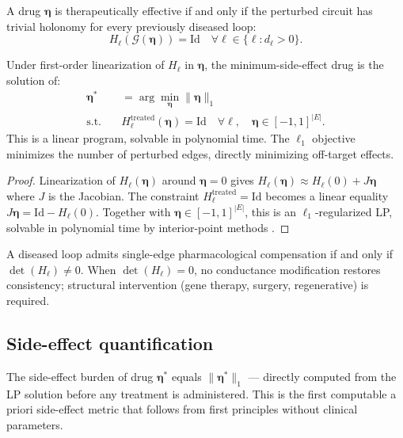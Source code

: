 \documentclass[twocolumn,11pt,a4paper]{article}
\newcommand{\Gcond}{\mathcal{G}}
\newcommand{\HolL}{H_\ell}
\newcommand{\drugvec}{\boldsymbol{\eta}}
\begin{document}
\begin{theorem}\label{thm:therapy}
A drug $\drugvec$ is therapeutically effective if and only if the
perturbed circuit has trivial holonomy for every previously diseased loop:
\[
\HolL(\Gcond(\drugvec)) = \mathrm{Id} \quad \forall \ell \in
\{\ell : d_\ell > 0\}.
\]
\end{theorem}

\begin{theorem}\label{thm:sparse}
Under first-order linearization of $\HolL$ in $\drugvec$, the
minimum-side-effect drug is the solution of:
\begin{equation}
\begin{aligned}
\drugvec^* &= \arg\min_{\drugvec} \|\drugvec\|_1 \\
\text{s.t.} \quad &\HolL^{\mathrm{treated}}(\drugvec) = \mathrm{Id}
\quad \forall \ell,\quad \drugvec \in [-1,1]^{|E|}.
\end{aligned}
\label{eq:L1}
\end{equation}
This is a linear program, solvable in polynomial time. The $\ell_1$
objective minimizes the number of perturbed edges, directly minimizing
off-target effects.
\end{theorem}

\begin{proof}
Linearization of $\HolL(\drugvec)$ around $\drugvec=0$ gives
$\HolL(\drugvec) \approx \HolL(0) + J\drugvec$ where $J$ is the
Jacobian. The constraint $\HolL^{\mathrm{treated}} = \mathrm{Id}$ becomes
a linear equality $J\drugvec = \mathrm{Id} - \HolL(0)$. Together with
$\drugvec\in[-1,1]^{|E|}$, this is an $\ell_1$-regularized LP,
solvable in polynomial time by interior-point methods \cite{dantzig1963}.
\end{proof}

\begin{theorem}[Reversibility]\label{thm:reversibility}
A diseased loop admits single-edge pharmacological compensation if and
only if $\det(\HolL) \neq 0$. When $\det(\HolL) = 0$, no
conductance modification restores consistency; structural intervention
(gene therapy, surgery, regenerative) is required.
\end{theorem}

\subsection{Side-effect quantification}

\begin{corollary}\label{cor:sideeffect}
The side-effect burden of drug $\drugvec^*$ equals $\|\drugvec^*\|_1$
--- directly computed from the LP solution before any treatment is
administered. This is the first computable a priori side-effect
metric that follows from first principles without clinical parameters.
\end{corollary}
\end{document}
